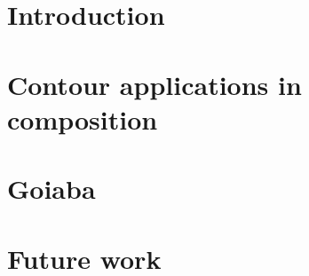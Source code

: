 

\section{Introduction}
\label{sec:introduction}

\section{Contour applications in composition}
\label{sec:cont-appl-comp}

\section{Goiaba}
\label{sec:goiaba}

\section{Future work}
\label{sec:future-work}

